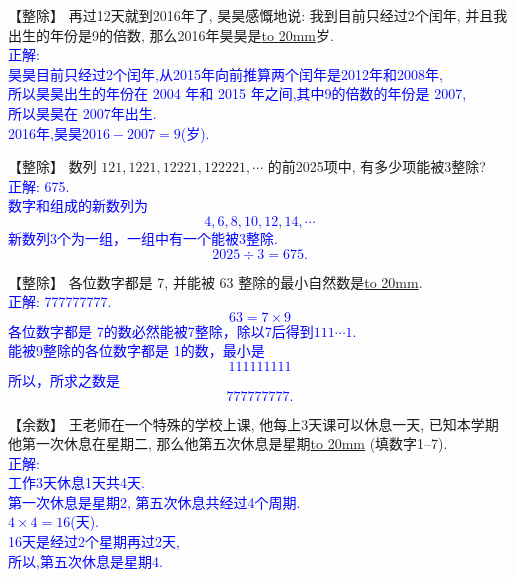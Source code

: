 
\item {
    【整除】
    再过12天就到2016年了, 昊昊感慨地说: 我到目前只经过2个闰年, 并且我出生的年份是9的倍数, 那么2016年昊昊是\underline{\hbox to 20mm{}}岁. 
    \ifshowSolution 
        \fangsong{}\textcolor{blue}{
            \\正解: \\
            昊昊目前只经过2个闰年,从2015年向前推算两个闰年是2012年和2008年,\\
            所以昊昊出生的年份在 2004 年和 2015 年之间,其中9的倍数的年份是 2007,\\
            所以昊昊在 2007年出生.\\
            2016年,昊昊$2016-2007=9$(岁).
        }
    \else
        \vspace{1cm}
    \fi
}

\item {
    【整除】
    数列 $121, 1221, 12221, 122221,\cdots$ 的前2025项中, 有多少项能被3整除? 
    \ifshowSolution
        \\\fangsong{}\textcolor{blue}{
            正解: 675.\\
            数字和组成的新数列为
            \[
                4,6,8,10,12,14,\cdots
            \]
            新数列3个为一组，一组中有一个能被3整除.
            \[
                2025\div 3 = 675.
            \]
        }
    \else
        \vspace{1cm}
    \fi
}

\item {
    【整除】
    各位数字都是 7, 并能被 63 整除的最小自然数是\underline{\hbox to 20mm{}}.
    \ifshowSolution
        \\\fangsong{}\textcolor{blue}{
            正解: 777777777.
            \[
                63 = 7\times 9
            \]
            各位数字都是 7的数必然能被7整除，除以7后得到$111\cdots 1$.\\
            能被9整除的各位数字都是 1的数，最小是 
            \[111111111\]
            所以，所求之数是
            \[777777777.\]
        }
    \else
        \vspace{1cm}
    \fi
}

\item {
    【余数】
    王老师在一个特殊的学校上课, 他每上3天课可以休息一天, 已知本学期他第一次休息在星期二, 那么他第五次休息是星期\underline{\hbox to 20mm{}} (填数字1--7).
    \ifshowSolution
        \\\fangsong{}\textcolor{blue}{
            正解: \\
            工作3天休息1天共4天.\\
            第一次休息是星期2, 第五次休息共经过4个周期.\\
            $4\times 4=16$(天).\\
            16天是经过2个星期再过2天,\\
            所以,第五次休息是星期4.
        }
    \else
        \vspace{1cm}
    \fi
}

